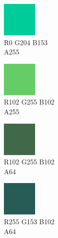 \begin{figure}[!h]
	\begin{subfigure}{0.105\textwidth}\centering
		\includegraphics[scale=1, frame]{gui-imgs/R0G204B153A255}
		\vspace*{-20px} \caption*{\hspace*{-0.25px}\tiny R0 G204 B153 \\ \tiny A255}
	\end{subfigure}
	\begin{subfigure}{0.105\textwidth}\centering
		\includegraphics[scale=1, frame]{gui-imgs/R102G255B102A255}
		\vspace*{-20px} \caption*{\hspace*{-0.25px}\tiny R102 G255 B102 \\ \tiny A255}
	\end{subfigure}
	\begin{subfigure}{0.105\textwidth}\centering
		\includegraphics[scale=1, frame]{gui-imgs/R102G255B102A64}
		\vspace*{-20px} \caption*{\hspace*{-0.25px}\tiny R102 G255 B102 \\ \tiny A64}
	\end{subfigure}
	\begin{subfigure}{0.105\textwidth}\centering
		\includegraphics[scale=1, frame]{gui-imgs/R0G204B153A64}
		\vspace*{-20px} \caption*{\hspace*{-0.25px}\tiny R255 G153 B102 \\ \tiny A64}
	\end{subfigure}
	\begin{subfigure}{0.105\textwidth}\centering

\end{subfigure}
\end{figure}
